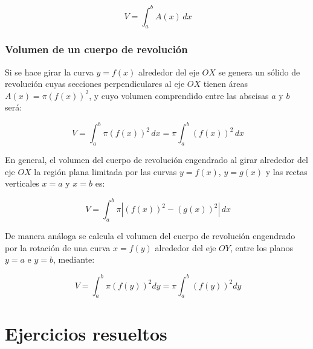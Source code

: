 \[
\ V = \int_{a}^{b}{A(x)\,dx}
\]

\subsubsection*{Volumen de un cuerpo de revolución}
Si se hace girar la curva $y=f(x)$ alrededor del eje $OX$ se genera
un sólido de revolución cuyas secciones perpendiculares al eje $OX$
tienen áreas $A(x)=\pi(f(x))^{2}$, y cuyo volumen comprendido entre
las abscisas $a$ y $b$ será:

\[
\ V = \int_{a}^{b}{\pi(f(x))^{2}\,dx}=
\pi\int_{a}^{b}{(f(x))^{2}\,dx}
\]


En general, el volumen del cuerpo de revolución engendrado al girar
alrededor del eje $OX$ la región plana limitada por las curvas
$y=f(x)$, $y=g(x)$ y las rectas verticales $x=a$ y $x=b$ es:

\[
\ V = \int_{a}^{b}{\pi|(f(x))^{2}-(g(x))^{2}|\,dx}
\]

De manera análoga se calcula el volumen del cuerpo de revolución
engendrado por la rotación de una curva $x=f(y)$ alrededor del eje
$OY$, entre los planos $y=a$ e $y=b$, mediante:

\[
\ V = \int_{a}^{b}{\pi(f(y))^{2}dy} = \pi \int_{a}^{b}{(f(y))^{2}dy}
\]


\section{Ejercicios resueltos}

